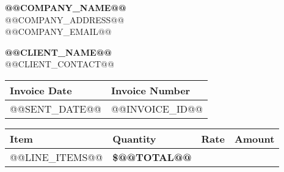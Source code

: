 \documentclass[11pt]{article}
\begin{document}
    \renewcommand{\arraystretch}{1.3}

    \begin{center}
    {\Huge \textbf{@@COMPANY_NAME@@}} \\
    \vspace{0.2cm}
    @@COMPANY_ADDRESS@@\\
    @@COMPANY_EMAIL@@
    \end{center}

    \vspace{1cm}

    \noindent
    \begin{minipage}{0.45\linewidth}
        \textbf{@@CLIENT_NAME@@} \\
        @@CLIENT_CONTACT@@  \\
    \end{minipage}
    \hfill
    \begin{minipage}{0.45\linewidth}
        \raggedleft
        \begin{tabular}{| C{3cm} | C{3cm} |}
            \hline
            \textbf{Invoice Date} & \textbf{Invoice Number} \\
            \hline
            @@SENT_DATE@@ & @@INVOICE_ID@@ \\
            \hline
        \end{tabular}
    \end{minipage}

    \vspace{1cm}

    \noindent
        \begin{tabularx}{\textwidth}{| X | Y | Y | Y |}
        \hline
            \textbf{Item} & \textbf{Quantity} & \textbf{Rate} & \textbf{Amount} \\
            \hline
            @@LINE_ITEMS@@
             &   \textbf{\$@@TOTAL@@} \\
        \end{tabularx}
\end{document}
